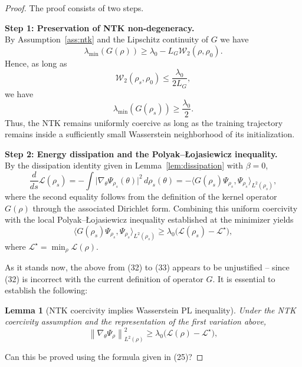 \documentclass[11pt,a4wide]{article}
\newtheorem{lemma}[theorem]{Lemma}
\theoremstyle{definition}
\newcommand{\Wass}{\mathcal{W}}
\begin{document}
\begin{proof}
The proof consists of two steps.

{\bf Step 1: Preservation of NTK non-degeneracy.}\\
By Assumption~\ref{ass:ntk} and the Lipschitz continuity of $G$ we have 
\[
\lambda_{\min}(G(\rho))
\ge
\lambda_0
-
L_G
\Wass_2(\rho,\rho_0).
\]
Hence, as long as 
\[
\Wass_2(\rho_s,\rho_0)
\le
\frac{\lambda_0}{2L_G},
\]
we have
\[
\lambda_{\min}(G(\rho_s))
\ge
\frac{\lambda_0}{2}.
\]
Thus, the NTK remains uniformly coercive as long as the training trajectory remains inside a sufficiently small Wasserstein neighborhood of its initialization.

{\bf Step 2: Energy dissipation and the Polyak–Łojasiewicz inequality.} \\ 
By the dissipation identity given in Lemma~\ref{lem:dissipation}  with $\beta=0$, 
\begin{equation}
\frac{d}{ds}\mathcal L(\rho_s)
=
-
\int 
\bigl|
\nabla_\theta\Psi_{\rho_s}(\theta)
\bigr|^2
\,d\rho_s(\theta)
=
-
\bigl\langle
G(\rho_s)\Psi_{\rho_s},
\Psi_{\rho_s}
\bigr\rangle_{L^2(\rho_s)},
\label{eq:pl-step1}
\end{equation}
where the second equality follows from the definition of the kernel operator
$G(\rho)$ through the associated Dirichlet form. Combining this uniform coercivity with the local Polyak--{\L}ojasiewicz
inequality established at the minimizer yields
\begin{equation}
\bigl\langle
G(\rho_s)\Psi_{\rho_s},
\Psi_{\rho_s}
\bigr\rangle_{L^2(\rho_s)}
\ge
\lambda_0
\bigl(
\mathcal L(\rho_s)
-
\mathcal L^\star
\bigr),
\label{eq:pl-step2}
\end{equation}
where
\(
\mathcal L^\star
=
\min_\rho\mathcal L(\rho).
\)

{ \color{red} 
As it stands now, the above from (32) to (33) appears to be unjustified -- since (32) is incorrect with the current definition of operator $G$.  It is essential  to establish the following: 
\begin{lemma}[NTK coercivity implies Wasserstein PL inequality]
Under the NTK coercivity assumption and the representation of the first variation above,
\[
\left\|\nabla_\theta \Psi_\rho\right\|_{L^2(\rho)}^2
\ge \lambda_0
\bigl(
\mathcal L(\rho)
-
\mathcal L^\star
\bigr),
\]
\end{lemma}
Can this be proved using the formula given in (25)?
} 




\end{proof}
\end{document}
